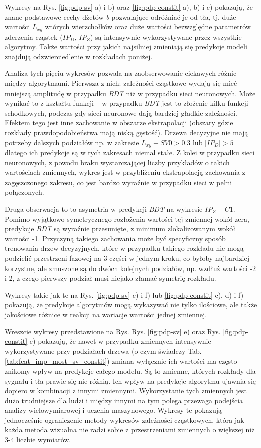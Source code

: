 \vspace{1em}
Wykresy na Rys. \ref{fig:pdp-sv} a) i b) oraz \ref{fig:pdp-constit} a), b) i c) pokazują, że znane podstawowe cechy dżetów \textit{b} pozwalające odróżniać je od tła, tj. duże wartości $L_{xy}$ wtórych wierzchołków oraz duże wartości bezwzględne parametrów zderzenia cząstek ($IP_D$, $IP_Z$) są intensywnie wykorzystywane przez wszystkie algorytmy. Także wartości przy jakich najsilniej zmieniają się predykcje modeli znajdują odzwierciedlenie w rozkładach poniżej.

Analiza tych pięciu wykresów pozwala na zaobserwowanie ciekawych różnic między algorytmami.
Pierwsza z nich: zależności cząstkowe wydają się mieć mniejszą amplitudę w przypadku \textit{BDT} niż w przypadku sieci neuronowych. Może wynikać to z kształtu funkcji -- w przypadku \textit{BDT} jest to złożenie kilku funkcji schodkowych, podczas gdy sieci neuronowe dają bardziej gładkie zależności. Efektem tego jest inne zachowanie w obszarze ekstrapolacji (obszary gdzie rozkłady prawdopodobieństwa mają niską gęstość). Drzewa decyzyjne nie mają potrzeby dalszych podziałów np. w zakresie $L_{xy} - SV0 > 0.3$ lub $|IP_D| > 5$ dlatego ich predykcje są w tych zakresach niemal stałe. Z kolei w przypadku sieci neuronowych, z powodu braku wystarczającej liczby przykładów o takich wartościach zmiennych, wykres jest w przybliżeniu ekstrapolacją zachowania z zagęszczonego zakresu, co jest bardzo wyraźnie w przypadku sieci w pełni połączonych. 

Druga obserwacja to to asymetria w predykcji \textit{BDT} na wykresie $IP_Z - C1$. Pomimo wyjątkowo symetrycznego rozłożenia wartości tej zmiennej wokół zera, predykcje \textit{BDT} są wyraźnie przesunięte, z minimum zlokalizowanym wokół wartości -1.
Przyczyną takiego zachowania może być specyficzny sposób trenowania drzew decyzyjnych, które w przypadku takiego rozkładu nie mogą podzielić przestrzeni fazowej na 3 części w jednym kroku, co byłoby najbardziej korzystne, ale zmuszone są do dwóch kolejnych podziałów, np. wzdłuż wartości -2 i 2, z czego pierwszy podział musi niejako złamać symetrię rozkładu.

Wykresy takie jak te na Rys. \ref{fig:pdp-sv} c) i f) lub \ref{fig:pdp-constit} c), d) i f) pokazują, że predykcje algorytmów mogą wykazywać nie tylko ilościowe, ale także jakościowe różnice w reakcji na wariacje wartości jednej zmiennej.

Wreszcie wykresy przedstawione na Rys. Rys. \ref{fig:pdp-sv} e) oraz Rys. \ref{fig:pdp-constit} e) pokazują, że nawet w przypadku zmiennych intensywnie wykorzystywane przy podziałach drzewa (o czym świadczy Tab. \ref{tab:feat_imp_most_sv_constit}) zmiana wyłącznie ich wartości ma często znikomy wpływ na predykcje całego modelu. Są to zmienne, których rozkłady dla sygnału i tła prawie się nie różnią. Ich wpływ na predykcje algorytmu ujawnia się dopiero w kombinacji z innymi zmiennymi. Wykorzystanie tych zmiennych jest dużo trudniejsze dla ludzi i między innymi na tym polega przewaga podejścia analizy wielowymiarowej i uczenia maszynowego.
Wykresy te pokazują jednocześnie ograniczenie metody wykresów zależności cząstkowych, która jak każda metoda wizualna nie radzi sobie z przestrzeniami zmiennych o większej niż 3-4 liczbie wymiarów.

